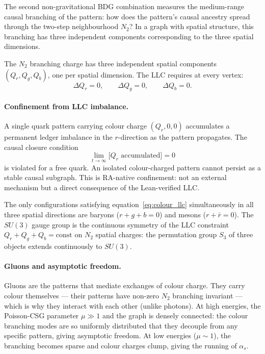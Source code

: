 \documentclass[11pt,a4paper]{article}
\begin{document}
The second non-gravitational BDG combination measures the medium-range
causal branching of the pattern: how does the pattern's causal ancestry
spread through the two-step neighbourhood $N_2$? In a graph with spatial
structure, this branching has three independent components corresponding to
the three spatial dimensions.

The $N_2$ branching charge has three independent spatial components
$(Q_r, Q_g, Q_b)$, one per spatial dimension. The LLC requires at every vertex:
\begin{equation}
  \Delta Q_r = 0, \qquad \Delta Q_g = 0, \qquad \Delta Q_b = 0.
  \label{eq:colour_llc}
\end{equation}

\paragraph{Confinement from LLC imbalance.}
A single quark pattern carrying colour charge $(Q_r, 0, 0)$ accumulates a
permanent ledger imbalance in the $r$-direction as the pattern propagates.
The causal closure condition
\begin{equation}
  \lim_{t\to\infty}\bigl[Q_r\text{ accumulated}\bigr] = 0
  \label{eq:causal_closure}
\end{equation}
is violated for a free quark. An isolated colour-charged pattern cannot persist
as a stable causal subgraph. This is RA-native confinement: not an external
mechanism but a direct consequence of the Lean-verified LLC.

The only configurations satisfying equation~\eqref{eq:colour_llc} simultaneously
in all three spatial directions are baryons ($r + g + b = 0$) and mesons
($r + \bar{r} = 0$). The $SU(3)$ gauge group is the continuous symmetry of
the LLC constraint $Q_r + Q_g + Q_b = \mathrm{const}$ on $N_2$ spatial charges:
the permutation group $S_3$ of three objects extends continuously to $SU(3)$.

\paragraph{Gluons and asymptotic freedom.}
Gluons are the patterns that mediate exchanges of colour charge. They carry
colour themselves --- their patterns have non-zero $N_2$ branching invariant
--- which is why they interact with each other (unlike photons). At high
energies, the Poisson-CSG parameter $\mu \gg 1$ and the graph is densely
connected: the colour branching modes are so uniformly distributed that they
decouple from any specific pattern, giving asymptotic freedom. At low energies
($\mu \sim 1$), the branching becomes sparse and colour charges clump,
giving the running of $\alpha_s$.
\end{document}
